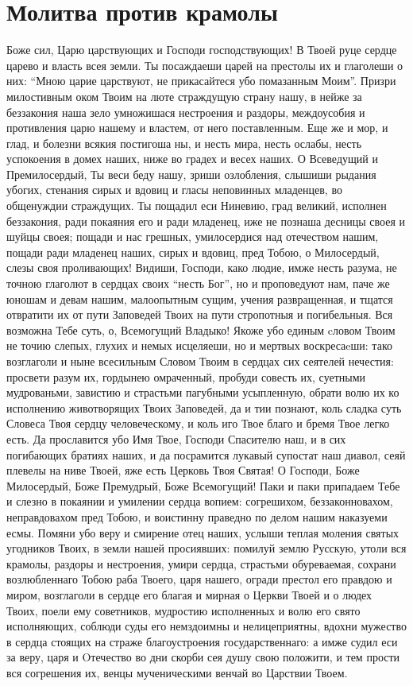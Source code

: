 \section{Молитва против крамолы}\begin{mymulticols}
 

Боже сил, Царю царствующих и Господи господствующих! В Твоей руце сердце царево и власть всея земли. Ты посаждаеши царей на престолы их и глаголеши о них: “Мною царие царствуют, не прикасайтеся убо помазанным Моим”. Призри милостивным оком Твоим на люте страждущую страну нашу, в нейже за беззакония наша зело умножишася нестроения и раздоры, междоусобия и противления царю нашему и властем, от него поставленным. Еще же и мор, и глад, и болезни всякия постигоша ны, и несть мира, несть ослабы, несть успокоения в домех наших, ниже во градех и весех наших. О Всеведущий и Премилосердый, Ты веси беду нашу, зриши озлобления, слышиши рыдания убогих, стенания сирых и вдовиц и гласы неповинных младенцев, во общенуждии страждущих. Ты пощадил еси Ниневию, град великий, исполнен беззакония, ради покаяния его и ради младенец, иже не познаша десницы своея и шуйцы своея; пощади и нас грешных, умилосердися над отечеством нашим, пощади ради младенец наших, сирых и вдовиц, пред Тобою, о Милосердый, слезы своя проливающих! Видиши, Господи, како людие, имже несть разума, не точною глаголют в сердцах своих “несть Бог”, но и проповедуют нам, паче же юношам и девам нашим, малоопытным сущим, учения развращенная, и тщатся отвратити их от пути Заповедей Твоих на пути стропотныя и погибельныя. Вся возможна Тебе суть, о, Всемогущий Владыко! Якоже убо единым cловом Твоим не точию слепых, глухих и немых исцеляеши, но и мертвых воскресаeши: тако возглаголи и ныне всесильным Словом Твоим в сердцах сих сеятелей нечестия: просвети разум их, гордынею омраченный, пробуди совесть их, суетными мудрованьми, завистию и страстьми пагубными усыпленную, обрати волю их ко исполнению животворящих Твоих Заповедей, да и тии познают, коль сладка суть Словеса Твоя сердцу человеческому, и коль иго Твое благо и бремя Твое легко есть. Да прославится убо Имя Твое, Господи Спасителю наш, и в сих погибающих братиях наших, и да посрамится лукавый супостат наш диавол, сеяй плевелы на ниве Твоей, яже есть Церковь Твоя Святая! О Господи, Боже Милосердый, Боже Премудрый, Боже Всемогущий! Паки и паки припадаем Тебе и слезно в покаянии и умилении сердца вопием: согрешихом, беззаконновахом, неправдовахом пред Тобою, и воистинну праведно по делом нашим наказуеми есмы. Помяни убо веру и смирение отец наших, услыши теплая моления святых угодников Твоих, в земли нашей просиявших: помилуй землю Русскую, утоли вся крамолы, раздоры и нестроения, умири сердца, страстьми обуреваемая, сохрани возлюбленнаго Тобою раба Твоего, царя нашего, огради престол его правдою и миром, возглаголи в сердце его благая и мирная о Церкви Твоей и о людех Твоих, поели ему советников, мудростию исполненных и волю его свято исполняющих, соблюди суды его немздоимны и нелицеприятны, вдохни мужество в сердца стоящих на страже благоустроения государственнаго: а имже судил еси за веру, царя и Oтечество во дни скорби сея душу свою положити, и тем прости вся согрешения их, венцы мученическими венчай во Царствии Твоем. 
\end{mymulticols}
